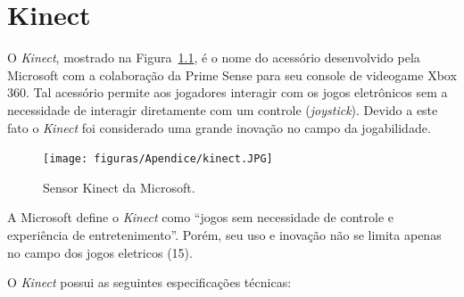 \chapter{Kinect}
\label{sec:kinect}


O \textit{Kinect}, mostrado na Figura~\ref{kinect}, é o nome do acessório desenvolvido pela Microsoft com a colaboração da Prime Sense para seu console de videogame Xbox 360. Tal acessório permite aos jogadores interagir com os jogos eletrônicos sem a necessidade de interagir diretamente com um controle (\textit{joystick}). Devido a este fato o \textit{Kinect} foi considerado uma grande inovação no campo da jogabilidade.

	\begin{figure}[hbt]
		\begin{center}
		\texttt{[image: figuras/Apendice/kinect.JPG]}
		\end{center}
		\caption{Sensor Kinect da Microsoft.}
		\label{kinect}
	\end{figure}

	A Microsoft define o \textit{Kinect} como ``jogos sem necessidade de controle e experiência de entretenimento''. Porém, seu uso e inovação não se limita apenas no campo dos jogos eletricos (15).

	O \textit{Kinect} possui as seguintes especificações técnicas:

